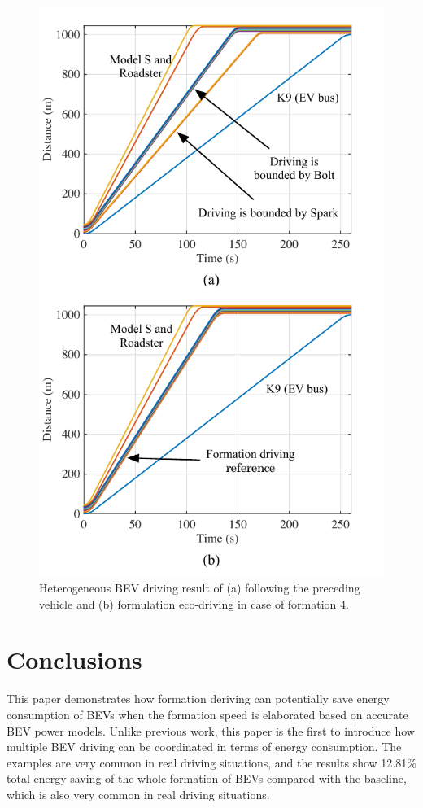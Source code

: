 \documentclass{IEEEtran}
\begin{document}
\begin{figure}	%
\centering
\includegraphics[width=1.0\hsize]{Figures/Driving_comparison.pdf}
\caption{Heterogeneous BEV driving result of (a) following the preceding vehicle and (b) formulation eco-driving in case of formation 4.}
\label{fig:driving_comp}
\end{figure} 


\section{Conclusions}

This paper demonstrates how formation deriving can potentially save energy consumption of BEVs when the formation speed is elaborated based on accurate BEV power models. Unlike previous work, this paper is the first to introduce how multiple BEV driving can be coordinated in terms of energy consumption. The examples are very common in real driving situations, and the results show 12.81\% total energy saving of the whole formation of BEVs compared with the baseline, which is also very common in real driving situations. 





\end{document}
